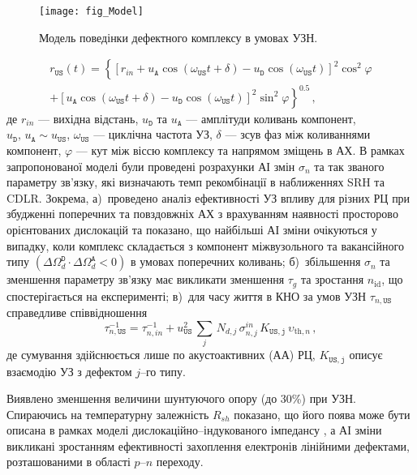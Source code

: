 \documentclass[a5paper,10pt,twoside,openany,article]{memoir} %
\begin{document}
\begin{figure}[ht]
\center
\texttt{[image: fig\_Model]}
\caption{\label{fig_Model}
Модель поведінки дефектного комплексу в умовах УЗН.
}%
\end{figure}

\begin{multline}
\label{eqrUS}
r_\mathtt{US}(t)=\left\{[r_{in}+u_\mathtt{A}\cos(\omega_\mathtt{US}t+\delta)-u_\mathtt{D}\cos(\omega_\mathtt{US}t)]^2\cos^2\varphi \right.\\
    \left.+ [u_\mathtt{A}\cos(\omega_\mathtt{US}t+\delta)-u_\mathtt{D}\cos(\omega_\mathtt{US}t)]^2\sin^2\varphi\right\}^{0.5}\,,
\end{multline}
де
$r_{in}$ --- вихідна відстань,
$u_\mathtt{D}$ та $u_\mathtt{A}$ --- амплітуди коливань компонент, $u_\mathtt{D},\,u_\mathtt{A}\sim u_\mathtt{US}$,
$\omega_\mathtt{US}$ --- циклічна частота УЗ,
$\delta$ --- зсув фаз між коливаннями компонент,
$\varphi$ --- кут між віссю комплексу та напрямом зміщень в АХ.
В рамках запропонованої моделі були проведені розрахунки АІ змін $\sigma_{n}$ та так званого параметру зв'язку,
які визначають темп рекомбінації в наближеннях SRH та  CDLR.
Зокрема,
а)~проведено аналіз ефективності УЗ впливу для різних РЦ при збудженні поперечних та повздовжніх АХ з врахуванням наявності просторово орієнтованих дислокацій та показано, що найбільші АІ зміни очікуються у випадку, коли комплекс складається з компонент міжвузольного та вакансійного типу $(\Delta\Omega_d^\mathtt{D}\cdot\Delta\Omega_d^\mathtt{A}<0)$
 в умовах поперечних коливань;
б)~збільшення $\sigma_{n}$ та зменшення параметру зв'язку має викликати зменшення $\tau_g$ та зростання $n_\mathrm{id}$, що спостерігається на експерименті;
в)~для часу життя в КНО за умов УЗН $\tau_{n,\mathtt{US}}$ справедливе співвідношення
\begin{equation}
\label{eqEpsSigUSA}
\tau_{n,\mathtt{US}}^{-1}=
\tau_{n,in}^{-1}+u_{\mathtt{US}}^2\,\sum_j\,N_{d,j}\,\sigma_{n,j}^{in}\,K_\mathtt{US,j}\,\upsilon_{\mathrm{th},n}\,,
\end{equation}
де
сумування здійснюється лише по акустоактивних (АА) РЦ,
$K_\mathtt{US,j}$ описує взаємодію УЗ з дефектом $j$--го типу.

Виявлено зменшення величини шунтуючого опору (до 30\%) при УЗН.
Спираючись на температурну залежність $R_{sh}$ показано, що його поява може бути описана в рамках моделі дислокаційно--індукованого імпедансу \cite{Rsh:Gopal2004}, а АІ зміни викликані зростанням ефективності захоплення електронів лінійними дефектами, розташованими в області $p$--$n$ переходу.
\end{document}

